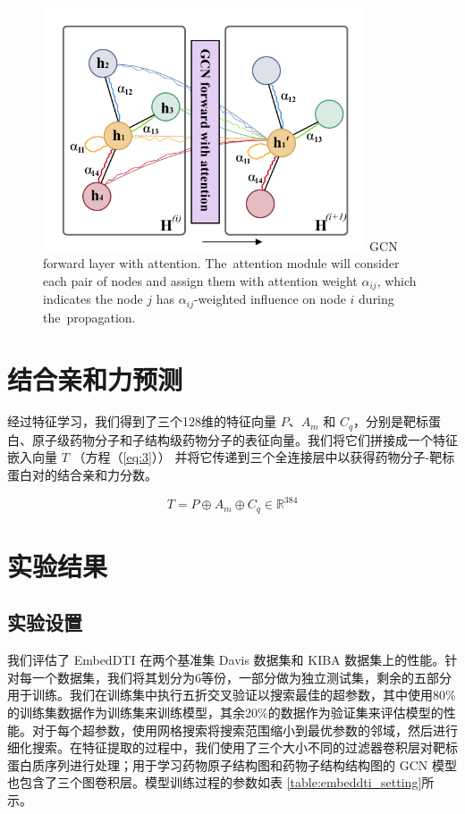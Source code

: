 \begin{figure}[!htbp] 
\centering
\includegraphics[width=0.85\textwidth]  {imgs/gcn_forward.png}
{GCN forward layer with attention. The~attention module will consider each pair of nodes and assign them with attention weight $\alpha_{ij}$, which indicates the node $j$ has $\alpha_{ij}$-weighted influence on node $i$ during the~propagation.}
\label{fig:gcn_forward}
\end{figure}


\section{结合亲和力预测} \label{5.5}
经过特征学习，我们得到了三个128维的特征向量 $P$、$A_m$ 和 $C_q$，分别是靶标蛋白、原子级药物分子和子结构级药物分子的表征向量。我们将它们拼接成一个特征嵌入向量 $T$ （方程（\ref{eq:3}）） 并将它传递到三个全连接层中以获得药物分子-靶标蛋白对的结合亲和力分数。

\begin{equation}
    T = P \oplus A_{m} \oplus C_{q} \in \mathbb{R}^{384}
\label{eq:3}
\end{equation}

\section{实验结果}
\subsection{实验设置}
我们评估了 EmbedDTI 在两个基准集 Davis 数据集和 KIBA 数据集上的性能。针对每一个数据集，我们将其划分为6等份，一部分做为独立测试集，剩余的五部分用于训练。我们在训练集中执行五折交叉验证以搜索最佳的超参数，其中使用80\%的训练集数据作为训练集来训练模型，其余20\%的数据作为验证集来评估模型的性能。对于每个超参数，使用网格搜索将搜索范围缩小到最优参数的邻域，然后进行细化搜索。在特征提取的过程中，我们使用了三个大小不同的过滤器卷积层对靶标蛋白质序列进行处理；用于学习药物原子结构图和药物子结构结构图的 GCN 模型也包含了三个图卷积层。模型训练过程的参数如表 \ref{table:embeddti_setting}所示。

